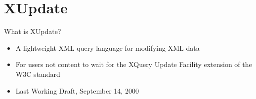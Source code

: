 \documentclass[sans]{beamer}
\begin{document}

\section{XUpdate}

\begin{frame}{What is XUpdate?}
	\begin{itemize}
		\item A lightweight XML query language for modifying XML data
		\item For users not content to wait for the XQuery Update Facility extension of the W3C standard
		\item Last Working Draft, September 14, 2000
	\end{itemize}
\end{frame}
\end{document}
